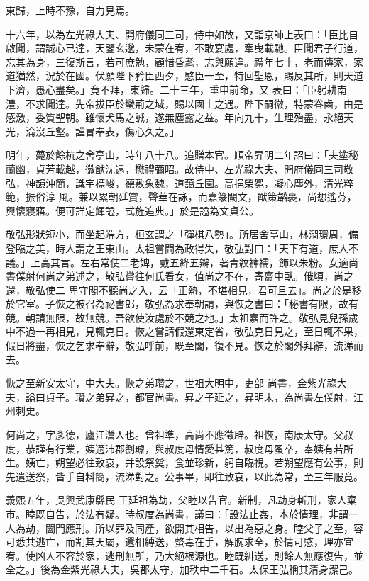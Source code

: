 \begin{pinyinscope}
 東歸，上時不豫，自力見焉。



 十六年，以為左光祿大夫、開府儀同三司，侍中如故，又詣京師上表曰：「臣比自啟聞，謂誠心已達，天鑒玄邈，未蒙在宥，不敢宴處，牽曳載馳。臣聞君子行道，忘其為身，三復斯言，若可庶勉，顧惜昏耄，志與願違。禮年七十，老而傳家，家道猶然，況於在國。伏願陛下矜臣西夕，愍臣一至，特回聖恩，賜反其所，則天道下濟，愚心盡矣。」竟不拜，東歸。二十三年，重申前命，又
 表曰：「臣躬耕南澧，不求聞達。先帝拔臣於蠻荊之域，賜以國士之遇。陛下嗣徽，特蒙眷齒，由是感激，委質聖朝。雖懷犬馬之誠，遂無塵露之益。年向九十，生理殆盡，永絕天光，淪沒丘壑。謹冒奉表，傷心久之。」



 明年，薨於餘杭之舍亭山，時年八十八。追贈本官。順帝昇明二年詔曰：「夫塗秘蘭幽，貞芳載越，徽猷沈遠，懋禮彌昭。故侍中、左光祿大夫、開府儀同三司敬弘，神韻沖簡，識宇標峻，德敷象魏，道藹丘園。高挹榮冕，凝心塵外，清光粹範，振俗淳
 風。兼以累朝延賞，聲華在詠，而嘉篆闕文，猷策韜裹，尚想遙芬，興懷寢寤。便可詳定輝謚，式旌追典。」於是謚為文貞公。



 敬弘形狀短小，而坐起端方，桓玄謂之「彈棋八勢」。所居舍亭山，林澗環周，備登臨之美，時人謂之王東山。太祖嘗問為政得失，敬弘對曰：「天下有道，庶人不議。」上高其言。左右常使二老婢，戴五絳五辮，著青紋褲襦，飾以朱粉。女適尚書僕射何尚之弟述之，敬弘嘗往何氏看女，值尚之不在，寄齋中臥。俄頃，尚之還，敬弘使二
 卑守閣不聽尚之入，云「正熱，不堪相見，君可且去」。尚之於是移於它室。子恢之被召為祕書郎，敬弘為求奉朝請，與恢之書曰：「秘書有限，故有競。朝請無限，故無競。吾欲使汝處於不競之地。」太祖嘉而許之。敬弘見兒孫歲中不過一再相見，見輒克日。恢之嘗請假還東定省，敬弘克日見之，至日輒不果，假日將盡，恢之乞求奉辭，敬弘呼前，既至閣，復不見。恢之於閣外拜辭，流涕而去。



 恢之至新安太守，中大夫。恢之弟瓚之，世祖大明中，吏部
 尚書，金紫光祿大夫，謚曰貞子。瓚之弟昇之，都官尚書。昇之子延之，昇明末，為尚書左僕射，江州刺史。



 何尚之，字彥德，廬江灊人也。曾祖準，高尚不應徵辟。祖恢，南康太守。父叔度，恭謹有行業，姨適沛郡劉璩，與叔度母情愛甚篤，叔度母蚤卒，奉姨有若所生。姨亡，朔望必往致哀，并設祭奠，食並珍新，躬自臨視。若朔望應有公事，則先遣送祭，皆手自料簡，流涕對之。公事畢，即往致哀，以此為常，至三年服竟。



 義熙五年，吳興武康縣民
 王延祖為劫，父睦以告官。新制，凡劫身斬刑，家人棄市。睦既自告，於法有疑。時叔度為尚書，議曰：「設法止姦，本於情理，非謂一人為劫，闔門應刑。所以罪及同產，欲開其相告，以出為惡之身。睦父子之至，容可悉共逃亡，而割其天屬，還相縛送，螫毒在手，解腕求全，於情可愍，理亦宜宥。使凶人不容於家，逃刑無所，乃大絕根源也。睦既糾送，則餘人無應復告，並全之。」後為金紫光祿大夫，吳郡太守，加秩中二千石。太保王弘稱其清身潔己。




\end{pinyinscope}
